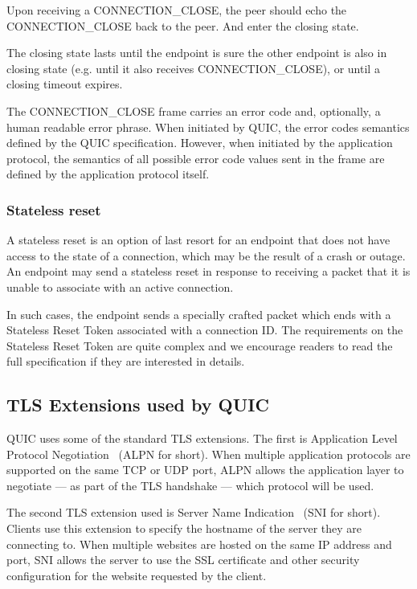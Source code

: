 Upon receiving a CONNECTION\_CLOSE, the peer should echo the CONNECTION\_CLOSE back to the peer. And
enter the closing state.

The closing state lasts until the endpoint is sure the other endpoint is also in closing state (e.g.
until it also receives CONNECTION\_CLOSE), or until a closing timeout expires.

The CONNECTION\_CLOSE frame carries an error code and, optionally, a human readable error phrase.
When initiated by QUIC, the error codes semantics defined by the QUIC specification. However, when
initiated by the application protocol, the semantics of all possible error code values sent in the
frame are defined by the application protocol itself.

\subsubsection{Stateless reset}

A stateless reset is an option of last resort for an endpoint that does not have access to the state
of a connection, which may be the result of a crash or outage. An endpoint may send a stateless
reset in response to receiving a packet that it is unable to associate with an active connection.

In such cases, the endpoint sends a specially crafted packet which ends with a Stateless Reset Token
associated with a connection ID\@. The requirements on the Stateless Reset Token are quite complex
and we encourage readers to read the full specification if they are interested in details. 

\subsection{TLS Extensions used by QUIC}

QUIC uses some of the standard TLS extensions. The first is Application Level Protocol
Negotiation~\cite{rfc7301} (ALPN for short). When multiple application protocols are supported on
the same TCP or UDP port, ALPN allows the application layer to negotiate --- as part of the TLS
handshake --- which protocol will be used.

The second TLS extension used is Server Name Indication~\cite{rfc6066} (SNI for short). Clients use
this extension to specify the hostname of the server they are connecting to. When multiple websites
are hosted on the same IP address and port, SNI allows the server to use the SSL certificate and
other security configuration for the website requested by the client.

